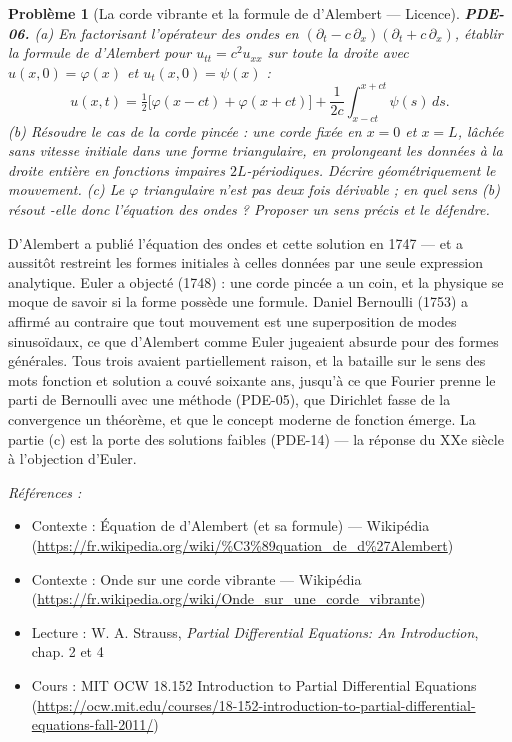 \documentclass[11pt]{article}
\newtheorem{problem}{Problème}
\newenvironment{refs}{\par\small\noindent\emph{Références :}\begin{itemize}\setlength\itemsep{0pt}}{\end{itemize}\normalsize}
\begin{document}
\bigskip

\begin{problem}[{La corde vibrante et la formule de d'Alembert --- Licence}]
\textbf{PDE-06.} (a) En factorisant l'opérateur des ondes en
$(\partial_t - c\,\partial_x)(\partial_t + c\,\partial_x)$, établir la formule de d'Alembert
pour $u_{tt} = c^2 u_{xx}$ sur toute la droite avec $u(x,0) = \varphi(x)$
et $u_t(x,0) = \psi(x)$ :
\[ u(x,t) = \tfrac{1}{2}\big[\varphi(x-ct) + \varphi(x+ct)\big]
+ \frac{1}{2c}\int_{x-ct}^{x+ct} \psi(s)\,ds. \]
(b) Résoudre le cas de la corde pincée : une corde fixée en $x = 0$ et $x = L$, lâchée sans
vitesse initiale dans une forme triangulaire, en prolongeant les données à la droite entière en
fonctions impaires $2L$-périodiques. Décrire géométriquement le mouvement. (c) Le $\varphi$
triangulaire n'est pas deux fois dérivable ; en quel sens (b) \og{} résout \fg{}-elle donc l'équation des
ondes ? Proposer un sens précis et le défendre.
\end{problem}

\noindent D'Alembert a publié l'équation des ondes et cette solution en 1747 --- et a
aussitôt restreint les formes initiales à celles données par une seule expression analytique.
Euler a objecté (1748) : une corde pincée a un coin, et la physique se moque de savoir si la forme
possède une formule. Daniel Bernoulli (1753) a affirmé au contraire que tout mouvement est une
superposition de modes sinusoïdaux, ce que d'Alembert comme Euler jugeaient absurde pour des
formes générales. Tous trois avaient partiellement raison, et la bataille sur le sens des mots
\og{} fonction \fg{} et \og{} solution \fg{} a couvé soixante ans, jusqu'à ce que Fourier prenne le parti de
Bernoulli avec une méthode (PDE-05), que Dirichlet fasse de la convergence un théorème, et que le
concept moderne de fonction émerge. La partie (c) est la porte des solutions faibles
(PDE-14) --- la réponse du XXe siècle à l'objection d'Euler.

\begin{refs}
\item Contexte : Équation de d'Alembert (et sa formule) --- Wikipédia (\url{https://fr.wikipedia.org/wiki/%C3%89quation_de_d%27Alembert})
\item Contexte : Onde sur une corde vibrante --- Wikipédia (\url{https://fr.wikipedia.org/wiki/Onde_sur_une_corde_vibrante})
\item Lecture : W. A. Strauss, \textit{Partial Differential Equations: An Introduction}, chap. 2 et 4
\item Cours : MIT OCW 18.152 Introduction to Partial Differential Equations (\url{https://ocw.mit.edu/courses/18-152-introduction-to-partial-differential-equations-fall-2011/})
\end{refs}
\end{document}

